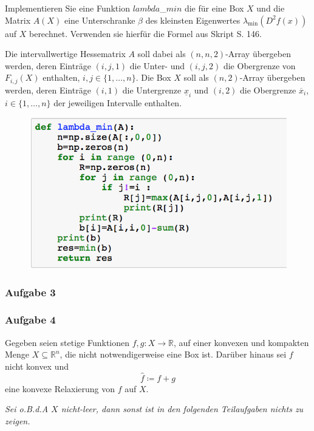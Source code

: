 \documentclass[12pt]{extreport} %
\newcommand{\R}{\mathbb{R}}
\begin{document}
Implementieren Sie eine Funktion $lambda$_$min$ die für eine Box $X$ und die Matrix $A(X)$ eine Unterschranke $\beta$ des kleinsten Eigenwertes $\lambda_{\min}(D^2f(x))$ auf $X$ berechnet. Verwenden sie hierfür die Formel aus Skript S. 146. ~\smallskip

Die intervallwertige Hessematrix $A$ soll dabei als $(n,n,2)$-Array übergeben werden, deren Einträge $(i,j,1)$ die Unter- und $(i,j,2)$ die Obergrenze von $F_{i,j}(X)$ enthalten, $i,j \in \{1, \dotsc, n\}$. Die Box $X$ soll als $(n, 2)$-Array übergeben werden, deren Einträge $(i, 1)$ die Untergrenze $\underline{x}_i$ und $(i, 2)$ die Obergrenze $\overline{x}_i$, $i \in \{1, \dotsc, n \}$ der jeweiligen Intervalle enthalten.

			\begin{figure}[h!] \centering
				\includegraphics[scale=.75]{img/su2iv-ii}
			\end{figure}
\newpage

\subsubsection*{Aufgabe 3}

\newpage

\subsubsection*{Aufgabe 4}

Gegeben seien stetige Funktionen $f, g \colon X \rightarrow \R$, auf einer konvexen und kompakten Menge $X \subseteq \R^n$, die nicht notwendigerweise eine Box ist. Darüber hinaus sei $f$ nicht konvex und 
	$$ \hat{f} \coloneqq f + g $$
eine konvexe Relaxierung von $f$ auf $X$.

\textit{Sei o.B.d.A $X$ nicht-leer, dann sonst ist in den folgenden Teilaufgaben nichts zu zeigen.}	
	
\end{document}
